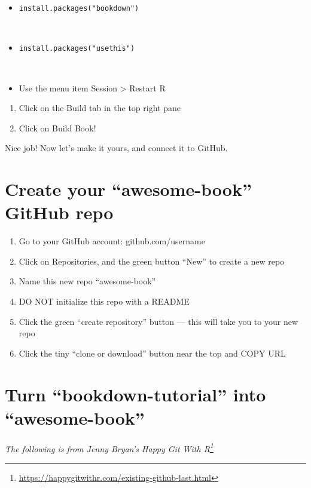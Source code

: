 \documentclass[
]{book}
\providecommand{\tightlist}{%
  \setlength{\itemsep}{0pt}\setlength{\parskip}{0pt}}
\renewcommand{\href}[2]{#2\footnote{\url{#1}}}
\begin{document}
\begin{itemize}
\tightlist
\item
  \texttt{install.packages("bookdown")}\strut \\
\item
  \texttt{install.packages("usethis")}\strut \\
\item
  Use the menu item Session \textgreater{} Restart R\\
\end{itemize}

\begin{enumerate}
\def\labelenumi{\arabic{enumi}.}
\tightlist
\item
  Click on the Build tab in the top right pane
\item
  Click on Build Book!
\end{enumerate}

Nice job! Now let's make it yours, and connect it to GitHub.

\hypertarget{create-your-awesome-book-github-repo}{%
\section{Create your ``awesome-book'' GitHub repo}\label{create-your-awesome-book-github-repo}}

\begin{enumerate}
\def\labelenumi{\arabic{enumi}.}
\tightlist
\item
  Go to your GitHub account: github.com/username
\item
  Click on Repositories, and the green button ``New'' to create a new repo
\item
  Name this new repo ``awesome-book''
\item
  DO NOT initialize this repo with a README
\item
  Click the green ``create repository'' button --- this will take you to your new repo
\item
  Click the tiny ``clone or download'' button near the top and COPY URL
\end{enumerate}

\hypertarget{turn-bookdown-tutorial-into-awesome-book}{%
\section{Turn ``bookdown-tutorial'' into ``awesome-book''}\label{turn-bookdown-tutorial-into-awesome-book}}

\emph{The following is from Jenny Bryan's \href{https://happygitwithr.com/existing-github-last.html}{Happy Git With R}}
\end{document}

